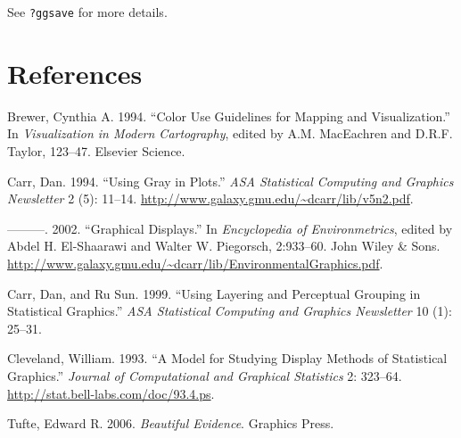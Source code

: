 See \texttt{?ggsave} for more details.

\section*{References}\label{references}

\hypertarget{refs}{}
\hypertarget{ref-brewer:1994}{}
Brewer, Cynthia A. 1994. ``Color Use Guidelines for Mapping and
Visualization.'' In \emph{Visualization in Modern Cartography}, edited
by A.M. MacEachren and D.R.F. Taylor, 123--47. Elsevier Science.

\hypertarget{ref-carr:1994}{}
Carr, Dan. 1994. ``Using Gray in Plots.'' \emph{ASA Statistical
Computing and Graphics Newsletter} 2 (5): 11--14.
\url{http://www.galaxy.gmu.edu/~dcarr/lib/v5n2.pdf}.

\hypertarget{ref-carr:2002}{}
---------. 2002. ``Graphical Displays.'' In \emph{Encyclopedia of
Environmetrics}, edited by Abdel H. El-Shaarawi and Walter W. Piegorsch,
2:933--60. John Wiley \& Sons.
\url{http://www.galaxy.gmu.edu/~dcarr/lib/EnvironmentalGraphics.pdf}.

\hypertarget{ref-carr:1999}{}
Carr, Dan, and Ru Sun. 1999. ``Using Layering and Perceptual Grouping in
Statistical Graphics.'' \emph{ASA Statistical Computing and Graphics
Newsletter} 10 (1): 25--31.

\hypertarget{ref-cleveland:1993a}{}
Cleveland, William. 1993. ``A Model for Studying Display Methods of
Statistical Graphics.'' \emph{Journal of Computational and Graphical
Statistics} 2: 323--64. \url{http://stat.bell-labs.com/doc/93.4.ps}.

\hypertarget{ref-tufte:2006}{}
Tufte, Edward R. 2006. \emph{Beautiful Evidence}. Graphics Press.
